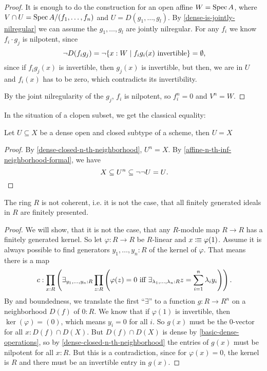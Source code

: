 \begin{proof}
  It is enough to do the construction for an open affine $W=\operatorname{Spec} A$,
  where $V\cap U=\operatorname{Spec} A/(f_1,\dots,f_n)$ and
  $U=D(g_1,\dots,g_l)$.
  By \cref{dense-is-jointly-nilregular} we can assume the $g_1,\dots,g_l$
  are jointly nilregular.
  For any $f_i$ we know $f_i\cdot g_j$ is nilpotent, since
  \[ \neg D(f_ig_j)=\neg\{x:W\mid f_ig_i(x)\text{ invertible}\} =\emptyset\rlap{,}\]
  since if $f_ig_j(x)$ is invertible, then $g_j(x)$ is invertible, but then, we are in
  $U$ and $f_i(x)$ has to be zero, which contradicts its invertibility.

  By the joint nilregularity of the $g_j$, $f_i$ is nilpotent,
  so $f_i^n=0$ and $V^n=W$.
\end{proof}

In the situation of a clopen subset, we get the classical equality:

\begin{lemma}%
  \label{clopen-dense-is-all}
  Let $U\subseteq X$ be a dense open and closed subtype of a scheme,
  then $U=X$
\end{lemma}

\begin{proof}
  By \cref{dense-closed-n-th-neighborhood},
  $U^n=X$.
  By \cref{affine-n-th-inf-neighborhood-formal}, we have
  \[
    X\subseteq U^n\subseteq \neg\neg U = U\rlap{.}
  \]
\end{proof}

\begin{theorem}%
  The ring $R$ is not coherent, i.e. it is not the case,
  that all finitely generated ideals in $R$ are finitely presented.
\end{theorem}

\begin{proof}
  We will show, that it is not the case,
  that any $R$-module map $R\to R$ has a finitely generated kernel.
  So let $\varphi:R\to R$ be $R$-linear and $x\vcentcolon\mspace{-1.2mu}\equiv \varphi(1)$.
  Assume it is always possible to find generators $y_1,\dots,y_n:R$ of the kernel of $\varphi$.
  That means there is a map
  \[
    c:\prod_{x:R}
    \left(
      \exists_{y_1,\dots,y_n:R}
      \prod_{z:R}
      \left(
        \varphi(z)=0 \text{ iff } \exists_{\lambda_1,\dots,\lambda_n:R}z=\sum_{i=1}^n \lambda_i y_i
      \right)
    \right)
    \rlap{.}
  \]
  By  and boundedness,
  we translate the first ``$\exists$'' to a function $g:R\to R^n$ on a neighborhood $D(f)$ of $0:R$.
  We know that if $\varphi(1)$ is invertible, then $\ker(\varphi)=(0)$, which means $y_i=0$ for all $i$.
  So $g(x)$ must be the 0-vector for all $x:D(f)\cap D(X)$.
  But $D(f)\cap D(X)$ is dense by \cref{basic-dense-operations},
  so by \cref{dense-closed-n-th-neighborhood} the entries of $g(x)$ must be nilpotent for all $x:R$.
  But this is a contradiction, since for $\varphi(x)=0$,
  the kernel is $R$ and there must be an invertible entry in $g(x)$.
\end{proof}

